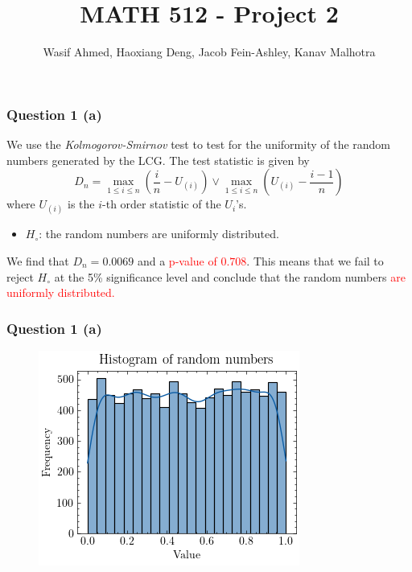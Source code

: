 \documentclass[compress,12pt]{beamer}
\title{MATH 512 - Project 2}
\subtitle{}
\date{}
\author{Wasif Ahmed, Haoxiang Deng, Jacob Fein-Ashley, Kanav Malhotra}
\newcommand{\myRed}[1]{\textcolor{red}{#1}}
\begin{document}
\frame[plain]{\titlepage}


\begin{frame}
      \frametitle{Question 1 (a)}
      We use the \emph{Kolmogorov-Smirnov} test to test for the uniformity of the random numbers generated by the LCG. The test statistic is given by
      \begin{equation*}
            D_n = \max_{1 \leq i \leq n} \left( \frac{i}{n} - U_{(i)} \right) \vee \max_{1 \leq i \leq n} \left( U_{(i)} - \frac{i-1}{n} \right)
      \end{equation*}
      where $U_{(i)}$ is the $i$-th order statistic of the $U_i$'s. 
      
      \begin{itemize}
            \item $H_{\circ}$: the random numbers are uniformly distributed. 
      \end{itemize}
      
    \begin{tcolorbox}
      We find that $D_n = 0.0069$ and a \myRed{p-value of $0.708$}. This means that we fail to reject $H_{\circ}$ at the 5\% significance level and conclude that the random numbers \myRed{are uniformly distributed.}
    \end{tcolorbox}
\end{frame}

\begin{frame}
      \frametitle{Question 1 (a)}
      \begin{figure}
            \centering
            \includegraphics[scale=0.7]{imgs/1a.png}
      \end{figure}
\end{frame}
\end{document}
